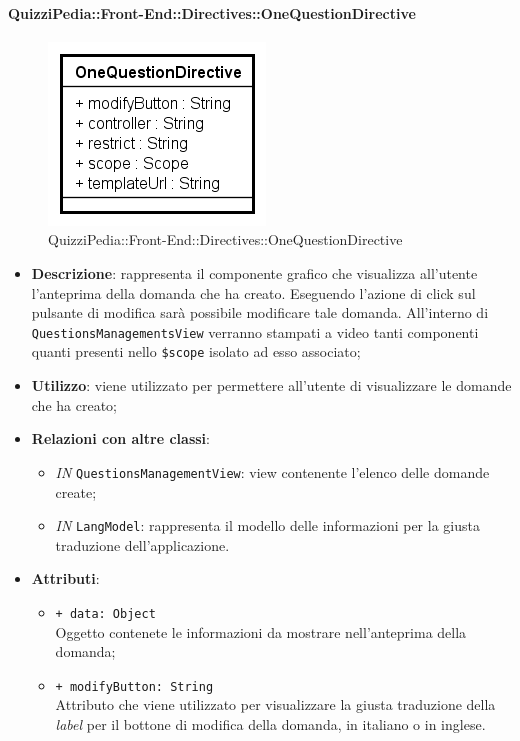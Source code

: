 \paragraph{QuizziPedia::Front-End::Directives::OneQuestionDirective}

\label{QuizziPedia::Front-End::Directives::OneQuestionDirective}

\begin{figure}[ht]
	\centering
	\includegraphics[scale=0.80,keepaspectratio]{UML/Classi/Front-End/QuizziPedia_Front-end_Directives_OneQuestionDirective.png}
	\caption{QuizziPedia::Front-End::Directives::OneQuestionDirective}
\end{figure} 
\FloatBarrier

\begin{itemize}
	\item \textbf{Descrizione}: rappresenta il componente grafico che visualizza all'utente l'anteprima della domanda che ha creato. Eseguendo l'azione di click sul pulsante di modifica sarà possibile modificare tale domanda. All'interno di \texttt{QuestionsManagementsView} verranno stampati a video tanti componenti quanti presenti nello \texttt{\$scope} isolato ad esso associato;
	\item \textbf{Utilizzo}: viene utilizzato per permettere all'utente di visualizzare le domande che ha creato;
	\item \textbf{Relazioni con altre classi}: 
	\begin{itemize}
		\item \textit{IN} \texttt{QuestionsManagementView}: view contenente l'elenco delle domande create;
		\item \textit{IN} \texttt{LangModel}: rappresenta il modello delle informazioni per la giusta traduzione dell'applicazione. 
	\end{itemize}
	\item \textbf{Attributi}: 
	\begin{itemize}
		\item \texttt{+ data: Object} \\ Oggetto contenete le informazioni da mostrare nell'anteprima della domanda;
		\item \texttt{+ modifyButton: String} \\ Attributo che viene utilizzato per visualizzare la giusta traduzione della \textit{label} per il bottone di modifica della domanda, in italiano o in inglese.
	\end{itemize}
\end{itemize}